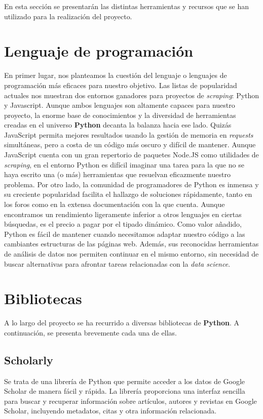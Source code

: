 
En esta sección se presentarán las distintas herramientas y recursos que se han utilizado para la realización del proyecto. 

\section{Lenguaje de programación}
En primer lugar, nos planteamos la cuestión del lenguaje o lenguajes de programación más eficaces para nuestro objetivo. Las listas de popularidad actuales nos muestran dos entornos ganadores para proyectos de \textit{scraping}: Python y Javascript. Aunque ambos lenguajes son altamente capaces para nuestro proyecto, la enorme base de conocimientos y la diversidad de herramientas creadas en el universo \textbf{Python} decanta la balanza hacia ese lado. Quizás JavaScript permita mejores resultados usando la gestión de memoria en \textit{requests} simultáneas, pero a costa de un código más oscuro y difícil de mantener. Aunque JavaScript cuenta con un gran repertorio de paquetes Node.JS como utilidades de \textit{scraping}, en el entorno Python es difícil imaginar una tarea para la que no se haya escrito una (o más) herramientas que resuelvan eficazmente nuestro problema. Por otro lado, la comunidad de programadores de Python es inmensa y su creciente popularidad facilita el hallazgo de soluciones rápidamente, tanto en los foros como en la extensa documentación con la que cuenta. Aunque encontramos un rendimiento ligeramente inferior a otros lenguajes en ciertas búsquedas, es el precio a pagar por el tipado dinámico. Como valor añadido, Python es fácil de mantener cuando necesitamos adaptar nuestro código a las cambiantes estructuras de las páginas web. Además, sus reconocidas herramientas de análisis de datos nos permiten continuar en el mismo entorno, sin necesidad de buscar alternativas para afrontar tareas relacionadas con la \textit{data science}.

\section{Bibliotecas}
A lo largo del proyecto se ha recurrido a diversas bibliotecas de \textbf{Python}. A continuación, se presenta brevemente cada una de ellas.

\subsection{Scholarly}
Se trata de una librería de Python que permite acceder a los datos de Google Scholar de manera fácil y rápida. La librería proporciona una interfaz sencilla para buscar y recuperar información sobre artículos, autores y revistas en Google Scholar, incluyendo metadatos, citas y otra información relacionada.

